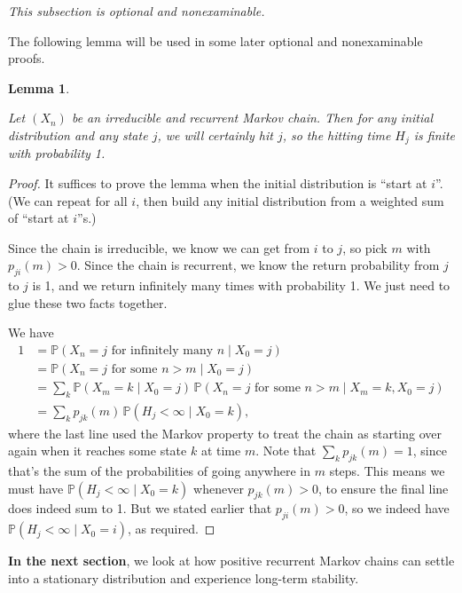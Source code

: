 \documentclass[
  a4paper,
]{article}
\newtheorem{lemma}{Lemma}[section]
\theoremstyle{definition}
\theoremstyle{definition}
\theoremstyle{definition}
\theoremstyle{remark}
\begin{document}
\emph{This subsection is optional and nonexaminable.}

The following lemma will be used in some later optional and nonexaminable proofs.

\begin{lemma}
\protect\hypertarget{lem:lemma}{}\label{lem:lemma}

Let \((X_n)\) be an irreducible and recurrent Markov chain. Then for any initial distribution and any state \(j\), we will certainly hit \(j\), so the hitting time \(H_j\) is finite with probability 1.

\end{lemma}

\begin{proof}

It suffices to prove the lemma when the initial distribution is ``start at \(i\)''. (We can repeat for all \(i\), then build any initial distribution from a weighted sum of ``start at \(i\)''s.)

Since the chain is irreducible, we know we can get from \(i\) to \(j\), so pick \(m\) with \(p_{ji}(m) > 0\). Since the chain is recurrent, we know the return probability from \(j\) to \(j\) is 1, and we return infinitely many times with probability 1. We just need to glue these two facts together.

We have
\begin{align*}
1 &= \mathbb P(X_n = j \text{ for infinitely many $n$} \mid X_0 = j) \\
&= \mathbb P(X_n = j \text{ for some $n > m$} \mid X_0 = j) \\
&= \sum_k \mathbb P(X_m = k \mid X_0 = j) \,\mathbb P(X_n = j \text{ for some $n > m$} \mid X_m = k, X_0 = j) \\
&= \sum_k p_{jk}(m) \,\mathbb P(H_j < \infty \mid X_0 = k) ,
\end{align*}
where the last line used the Markov property to treat the chain as starting over again when it reaches some state \(k\) at time \(m\). Note that \(\sum_k p_{jk}(m) = 1\), since that's the sum of the probabilities of going anywhere in \(m\) steps. This means we must have \(\mathbb P(H_j < \infty \mid X_0 = k)\) whenever \(p_{jk}(m) > 0\), to ensure the final line does indeed sum to 1. But we stated earlier that \(p_{ji}(m) > 0\), so we indeed have \(\mathbb P(H_j < \infty \mid X_0 = i)\), as required.

\end{proof}

\textbf{In the next section}, we look at how positive recurrent Markov chains can settle into a stationary distribution and experience long-term stability.
\end{document}
